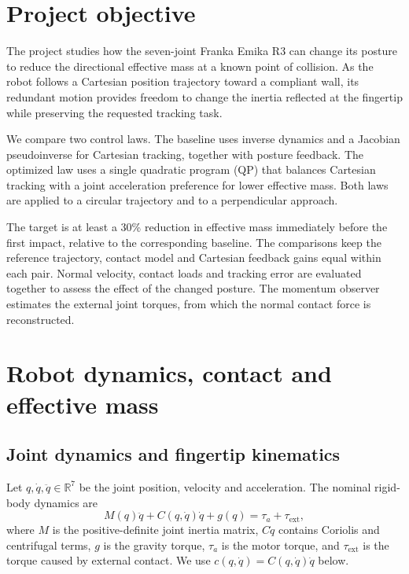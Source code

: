 \documentclass[11pt,a4paper]{article}
\begin{document}

\setcounter{page}{1}
\tableofcontents
\clearpage

\section{Project objective}
\label{sec:objective}
The project studies how the seven-joint Franka Emika R3 can change its posture
to reduce the directional effective mass at a known point of collision.
As the robot follows a Cartesian position trajectory toward a compliant
wall, its redundant motion provides freedom to change the inertia
reflected at the fingertip while preserving the requested tracking task.

We compare two control laws. The baseline uses inverse dynamics and a
Jacobian pseudoinverse for Cartesian tracking, together with posture feedback.
The optimized law uses a single quadratic program (QP) that balances Cartesian
tracking with a joint acceleration preference for lower effective mass. Both
laws are applied to a circular trajectory and to a perpendicular approach.

The target is at least a 30\% reduction in effective mass
immediately before the first impact, relative to the corresponding baseline.
The comparisons keep the reference trajectory, contact model and Cartesian
feedback gains equal within each pair. Normal velocity, contact loads and
tracking error are evaluated together to assess the effect of the changed
posture. The momentum observer estimates the external joint torques, from which the normal contact force is reconstructed.

\section{Robot dynamics, contact and effective mass}
\subsection{Joint dynamics and fingertip kinematics}
Let $q,\dot q,\ddot q\in\mathbb R^7$ be the joint position, velocity and
acceleration. The nominal rigid-body dynamics are
\begin{equation}
 M(q)\ddot q+C(q,\dot q)\dot q+g(q)
 =\tau_a+\tau_{\mathrm{ext}},
 \label{eq:dynamics}
\end{equation}
where $M$ is the positive-definite joint inertia matrix, $C\dot q$ contains
Coriolis and centrifugal terms, $g$ is the gravity torque, $\tau_a$ is the
motor torque, and $\tau_{\mathrm{ext}}$ is the torque caused by external contact.
We use $c(q,\dot q)=C(q,\dot q)\dot q$ below.
\end{document}
